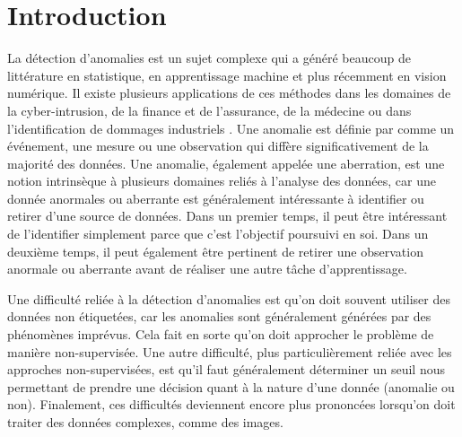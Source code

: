 \chapter*{Introduction}         %
\label{chap:introduction}       %


La détection d'anomalies est un sujet complexe qui a généré beaucoup de littérature en statistique,  en apprentissage machine et plus récemment en vision numérique. Il existe plusieurs applications de ces méthodes dans les domaines de la cyber-intrusion, de la finance et de l'assurance, de la médecine ou dans l'identification de dommages industriels \citep{chandola2009anomaly}. Une anomalie est définie par \cite{Zimek2017} comme un événement, une mesure ou une observation qui diffère significativement de la majorité des données. Une anomalie, également appelée une aberration, est une notion intrinsèque à plusieurs domaines reliés à l'analyse des données, car une donnée anormales ou aberrante est généralement intéressante à identifier ou retirer d'une source de données. Dans un premier temps, il peut être intéressant de l'identifier simplement parce que c'est  l'objectif poursuivi en soi. Dans un deuxième temps, il peut également être pertinent de retirer une observation anormale ou aberrante avant de réaliser une autre tâche d'apprentissage. 

Une difficulté reliée à la détection d'anomalies est qu'on doit souvent utiliser des données non étiquetées, car les anomalies sont généralement générées par des phénomènes imprévus. Cela fait en sorte qu'on doit approcher le problème de manière non-supervisée. Une autre difficulté, plus particulièrement reliée avec les approches non-supervisées, est qu'il faut généralement déterminer un seuil nous permettant de prendre une décision quant à la nature d'une donnée (anomalie ou non). Finalement, ces difficultés deviennent encore plus prononcées lorsqu'on doit traiter des données complexes, comme des images.

